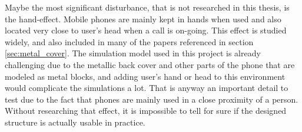 Maybe the most significant disturbance, that is not researched in this thesis, is the hand-effect. Mobile phones are mainly kept in hands when used and also located very close to user's head when a call is on-going. This effect is studied widely, and also included in many of the papers referenced in section \ref{sec:metal_cover}. The simulation model used in this project is already challenging due to the metallic back cover and other parts of the phone that are modeled as metal blocks, and adding user's hand or head to this environment would complicate the simulations a lot. That is anyway an important detail to test due to the fact that phones are mainly used in a close proximity of a person. Without researching that effect, it is impossible to tell for sure if the designed structure is actually usable in practice.


\clearpage